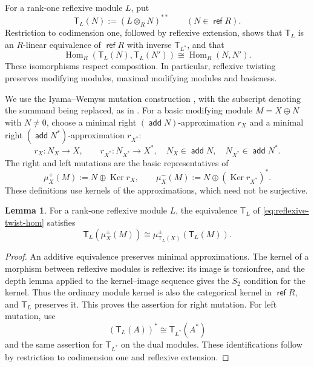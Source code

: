 \documentclass[a4paper,reqno]{amsart}
\DeclareMathOperator{\refl}{\mathsf{ref}}
\DeclareMathOperator{\add}{\mathsf{add}}
\DeclareMathOperator{\Hom}{Hom}
\DeclareMathOperator{\Ker}{Ker}
\theoremstyle{definition}
\newtheorem{Lem}[Thm]{Lemma}
\begin{document}
For a rank-one reflexive module $L$, put
\[
\mathsf T_L(N):=(L\otimes_RN)^{**}\qquad(N\in\refl R).
\]
Restriction to codimension one, followed by reflexive extension, shows that $\mathsf T_L$ is an $R$-linear equivalence of $\refl R$ with inverse $\mathsf T_{L^*}$, and that
\begin{equation}\label{eq:reflexive-twist-hom}
\Hom_R(\mathsf T_L(N),\mathsf T_L(N'))\cong\Hom_R(N,N').
\end{equation}
These isomorphisms respect composition. In particular, reflexive twisting preserves modifying modules, maximal modifying modules and basicness.

We use the Iyama--Wemyss mutation construction \cite[Section 6.1]{IW}, with the subscript denoting the summand being replaced, as in \cite[Section 4.1]{IW18}. For a basic modifying module $M=X\oplus N$ with $N\ne0$, choose a minimal right $(\add N)$-approximation $r_X$ and a minimal right $(\add N^*)$-approximation $r_{X^*}$:
\[
r_X\colon N_X\longrightarrow X,\qquad
r_{X^*}\colon N_{X^*}\longrightarrow X^*,
\quad N_X\in\add N,\quad N_{X^*}\in\add N^*.
\]
The right and left mutations are the basic representatives of
\begin{equation}\label{eq:iw-mutation-convention}
\mu_X^+(M):=N\oplus\Ker r_X,\qquad
\mu_X^-(M):=N\oplus(\Ker r_{X^*})^*.
\end{equation}
These definitions use kernels of the approximations, which need not be surjective.

\begin{Lem}\label{lem:twist-preserves-mutation}
For a rank-one reflexive module $L$, the equivalence $\mathsf T_L$ of \eqref{eq:reflexive-twist-hom} satisfies
\[
\mathsf T_L(\mu_X^\pm(M))
\cong\mu_{\mathsf T_L(X)}^\pm(\mathsf T_L(M)).
\]
\end{Lem}
\begin{proof}
An additive equivalence preserves minimal approximations. The kernel of a morphism between reflexive modules is reflexive: its image is torsionfree, and the depth lemma applied to the kernel--image sequence gives the $S_2$ condition for the kernel. Thus the ordinary module kernel is also the categorical kernel in $\refl R$, and $\mathsf T_L$ preserves it. This proves the assertion for right mutation. For left mutation, use
\[
(\mathsf T_L(A))^*\cong\mathsf T_{L^*}(A^*)
\]
and the same assertion for $\mathsf T_{L^*}$ on the dual modules. These identifications follow by restriction to codimension one and reflexive extension.
\end{proof}
\end{document}
